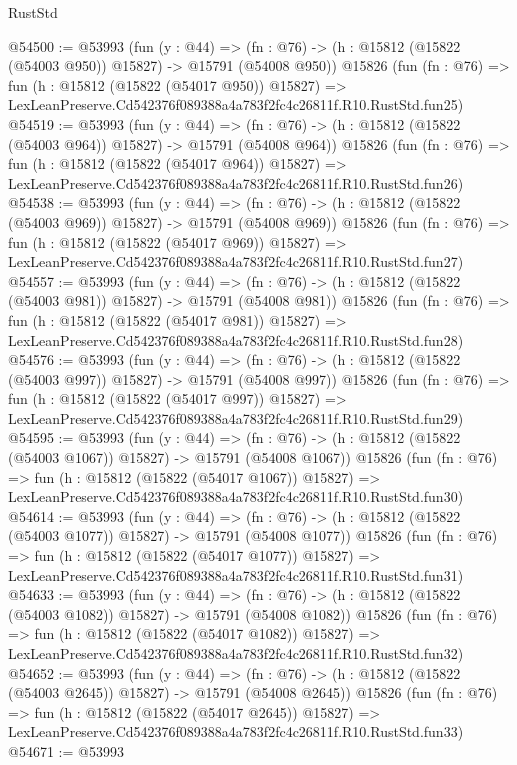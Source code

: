\begin{lexlean}{RustStd}
\begin{coremodule}
@54500 := @53993
    (fun (y : @44) =>
    (fn : @76) -> (h : @15812 (@15822 (@54003 @950)) @15827) -> @15791 (@54008 @950))
    @15826
    (fun (fn : @76) =>
    fun (h : @15812 (@15822 (@54017 @950)) @15827) =>
    LexLeanPreserve.Cd542376f089388a4a783f2fc4c26811f.R10.RustStd.fun25)
@54519 := @53993
    (fun (y : @44) =>
    (fn : @76) -> (h : @15812 (@15822 (@54003 @964)) @15827) -> @15791 (@54008 @964))
    @15826
    (fun (fn : @76) =>
    fun (h : @15812 (@15822 (@54017 @964)) @15827) =>
    LexLeanPreserve.Cd542376f089388a4a783f2fc4c26811f.R10.RustStd.fun26)
@54538 := @53993
    (fun (y : @44) =>
    (fn : @76) -> (h : @15812 (@15822 (@54003 @969)) @15827) -> @15791 (@54008 @969))
    @15826
    (fun (fn : @76) =>
    fun (h : @15812 (@15822 (@54017 @969)) @15827) =>
    LexLeanPreserve.Cd542376f089388a4a783f2fc4c26811f.R10.RustStd.fun27)
@54557 := @53993
    (fun (y : @44) =>
    (fn : @76) -> (h : @15812 (@15822 (@54003 @981)) @15827) -> @15791 (@54008 @981))
    @15826
    (fun (fn : @76) =>
    fun (h : @15812 (@15822 (@54017 @981)) @15827) =>
    LexLeanPreserve.Cd542376f089388a4a783f2fc4c26811f.R10.RustStd.fun28)
@54576 := @53993
    (fun (y : @44) =>
    (fn : @76) -> (h : @15812 (@15822 (@54003 @997)) @15827) -> @15791 (@54008 @997))
    @15826
    (fun (fn : @76) =>
    fun (h : @15812 (@15822 (@54017 @997)) @15827) =>
    LexLeanPreserve.Cd542376f089388a4a783f2fc4c26811f.R10.RustStd.fun29)
@54595 := @53993
    (fun (y : @44) =>
    (fn : @76) -> (h : @15812 (@15822 (@54003 @1067)) @15827) -> @15791 (@54008 @1067))
    @15826
    (fun (fn : @76) =>
    fun (h : @15812 (@15822 (@54017 @1067)) @15827) =>
    LexLeanPreserve.Cd542376f089388a4a783f2fc4c26811f.R10.RustStd.fun30)
@54614 := @53993
    (fun (y : @44) =>
    (fn : @76) -> (h : @15812 (@15822 (@54003 @1077)) @15827) -> @15791 (@54008 @1077))
    @15826
    (fun (fn : @76) =>
    fun (h : @15812 (@15822 (@54017 @1077)) @15827) =>
    LexLeanPreserve.Cd542376f089388a4a783f2fc4c26811f.R10.RustStd.fun31)
@54633 := @53993
    (fun (y : @44) =>
    (fn : @76) -> (h : @15812 (@15822 (@54003 @1082)) @15827) -> @15791 (@54008 @1082))
    @15826
    (fun (fn : @76) =>
    fun (h : @15812 (@15822 (@54017 @1082)) @15827) =>
    LexLeanPreserve.Cd542376f089388a4a783f2fc4c26811f.R10.RustStd.fun32)
@54652 := @53993
    (fun (y : @44) =>
    (fn : @76) -> (h : @15812 (@15822 (@54003 @2645)) @15827) -> @15791 (@54008 @2645))
    @15826
    (fun (fn : @76) =>
    fun (h : @15812 (@15822 (@54017 @2645)) @15827) =>
    LexLeanPreserve.Cd542376f089388a4a783f2fc4c26811f.R10.RustStd.fun33)
@54671 := @53993

\end{coremodule}
\end{lexlean}
